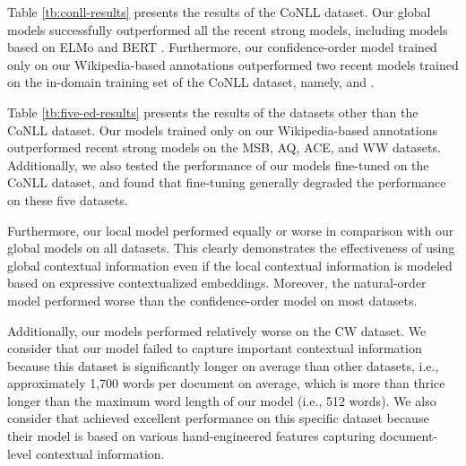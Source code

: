 \documentclass[11pt,a4paper]{article}
\begin{document}
Table \ref{tb:conll-results} presents the results of the CoNLL dataset.
Our global models successfully outperformed all the recent strong models, including models based on ELMo \cite{Shahbazi2019Entity-awareDisambiguation} and BERT  \cite{Broscheit2019InvestigatingLinking}.
Furthermore, our confidence-order model trained only on our Wikipedia-based annotations outperformed two recent models trained on the in-domain training set of the CoNLL dataset, namely,  and .

Table \ref{tb:five-ed-results} presents the results of the datasets other than the CoNLL dataset.
Our models trained only on our Wikipedia-based annotations outperformed recent strong models on the MSB, AQ, ACE, and WW datasets.
Additionally, we also tested the performance of our models fine-tuned on the CoNLL dataset, and found that fine-tuning generally degraded the performance on these five datasets.

Furthermore, our local model performed equally or worse in comparison with our global models on all datasets.
This clearly demonstrates the effectiveness of using global contextual information even if the local contextual information is modeled based on expressive contextualized embeddings.
Moreover, the natural-order model performed worse than the confidence-order model on most datasets.

Additionally, our models performed relatively worse on the CW dataset.
We consider that our model failed to capture important contextual information because this dataset is significantly longer on average than other datasets, i.e., approximately 1,700 words per document on average, which is more than thrice longer than the maximum word length of our model (i.e., 512 words).
We also consider that  achieved excellent performance on this specific dataset because their model is based on various hand-engineered features capturing document-level contextual information.

\begin{table}[tb]
  \centering
  \setlength{\tabcolsep}{4pt}
  \caption{In-KB accuracy on the CoNLL dataset split by the frequency in Wikipedia entity annotations. Our models were fine-tuned using the CoNLL dataset. \textbf{G\&H2017}: The results of .}
  \label{tb:analysis}
\end{table}
\end{document}
